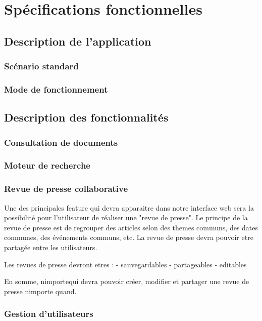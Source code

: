 \section{Spécifications fonctionnelles}
\label{sec:spec}

    \subsection{Description de l'application}
    \label{sec:dapp}

        \subsubsection{Scénario standard}
        \label{sec:scen}

        \subsubsection{Mode de fonctionnement}
        \label{sec:fonc}

    \subsection{Description des fonctionnalités}
    \label{sec:fonc}

        \subsubsection{Consultation de documents}
        \label{sec:cons}

        \subsubsection{Moteur de recherche}
        \label{sec:rech}

        \subsubsection{Revue de presse collaborative}
        \label{sec:revue}

        Une des principales feature qui devra apparaitre dans notre interface web sera
        la possibilité pour l'utilisateur de réaliser une "revue de presse". Le principe
        de la revue de presse est de regrouper des articles selon
        des themes communs, des dates communes, des événements communs, etc. La revue de
        presse devra pouvoir etre partagée entre les utilisateurs.

        Les revues de presse devront etres :
        - sauvegardables
        - partageables
        - editables

        En somme, nimportequi devra pouvoir créer, modifier et partager une revue de
        presse nimporte quand.

    \subsubsection{Gestion d'utilisateurs}
        \label{sec:utils}

